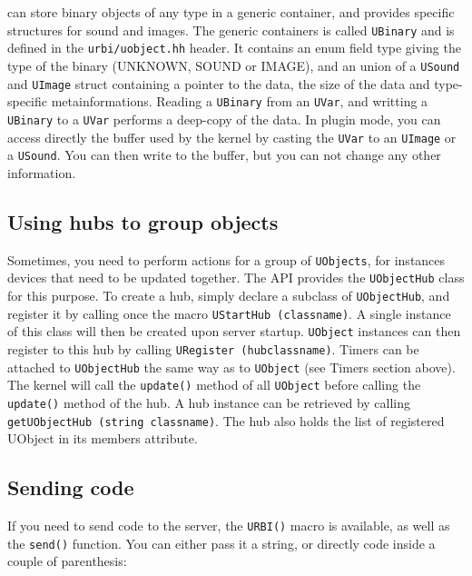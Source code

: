 \urbi can store binary objects of any type in a generic container, and
provides specific structures for sound and images. The generic
containers is called \lstinline{UBinary} and is defined in the
\lstinline{urbi/uobject.hh} header. It contains an enum field type
giving the type of the binary (UNKNOWN, SOUND or IMAGE), and an union
of a \lstinline{USound} and \lstinline{UImage} struct containing a
pointer to the data, the size of the data and type-specific
metainformations. Reading a \lstinline{UBinary} from an
\lstinline{UVar}, and writting a \lstinline{UBinary} to a
\lstinline{UVar} performs a deep-copy of the data. In plugin mode, you
can access directly the buffer used by the kernel by casting the
\lstinline{UVar} to an \lstinline{UImage} or a \lstinline{USound}. You
can then write to the buffer, but you can not change any other
information.

\subsection{Using hubs to group objects}

Sometimes, you need to perform actions for a group of
\lstinline{UObjects}, for instances devices that need to be updated
together. The API provides the \lstinline{UObjectHub} class for this
purpose. To create a hub, simply declare a subclass of
\lstinline{UObjectHub}, and register it by calling once the macro
\lstinline{UStartHub (classname)}. A single instance of this class
will then be created upon server startup. \lstinline{UObject}
instances can then register to this hub by calling
\lstinline{URegister (hubclassname)}. Timers can be attached to
\lstinline{UObjectHub} the same way as to \lstinline{UObject} (see
Timers section above). The kernel will call the \lstinline{update()}
method of all \lstinline{UObject} before calling the
\lstinline{update()} method of the hub. A hub instance can be
retrieved by calling \lstinline{getUObjectHub (string classname)}. The
hub also holds the list of registered UObject in its members
attribute.

\subsection{Sending \urbi code}

If you need to send \urbi code to the server, the \lstinline{URBI()}
macro is available, as well as the \lstinline{send()} function. You
can either pass it a string, or directly \urbi code inside a couple of
parenthesis:

